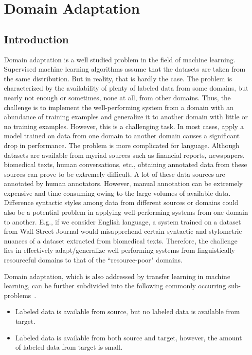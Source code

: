 \chapter{Domain Adaptation}

\section{Introduction}

Domain adaptation is a well studied problem in the field of machine learning. Supervised machine learning algorithms assume that the datasets are taken from the same distribution. But in reality, that is hardly the case. The problem is characterized by the availability of plenty of labeled data from some domains, but nearly not enough or sometimes, none at all, from other domains. Thus, the challenge is to implement the well-performing system from a domain with an abundance of training examples and generalize it to another domain with little or no training examples. However, this is a challenging task. In most cases, apply a model trained on data from one domain to another domain causes a significant drop in performance. The problem is more complicated for language. Although datasets are available from myriad sources such as financial reports, newspapers, biomedical texts, human conversations, etc., obtaining annotated data from these sources can prove to be extremely difficult. A lot of these data sources are annotated by human annotators. However, manual annotation can be extremely expensive and time consuming owing to the large volumes of available data. Difference syntactic styles among data from different sources or domains could also be a potential problem in applying well-performing systems from one domain to another. E.g., if we consider English language, a system trained on a dataset from Wall Street Journal would misapprehend certain syntactic and stylometric nuances of a dataset extracted from biomedical texts. Therefore, the challenge lies in effectively adapt/generalize well performing systems from linguistically resourceful domains to that of the ``resource-poor" domains. 

Domain adaptation, which is also addressed by transfer learning in machine learning, can be further subdivided into the following commonly occurring sub-problems~\citep{li2012literature}.
\begin{itemize}
    \item Labeled data is available from source, but no labeled data is available from target.
    \item Labeled data is available from both source and target, however, the amount of labeled data from target is small.
\end{itemize}

